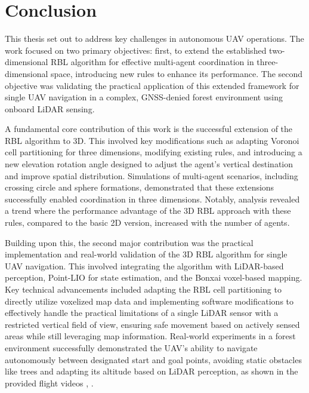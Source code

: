 
\chapter{Conclusion\label{chap:conclusion}}

This thesis set out to address key challenges in autonomous \ac{UAV} operations. 
The work focused on two primary objectives: first, to extend the established two-dimensional \ac{RBL} algorithm for effective multi-agent coordination in three-dimensional space, introducing new rules to enhance its performance. 
The second objective was validating the practical application of this extended framework for single  \ac{UAV} navigation in a complex, \ac{GNSS}-denied forest environment using onboard \ac{LiDAR} sensing.

A fundamental core contribution of this work is the successful extension of the \ac{RBL} algorithm to 3D.
This involved key modifications such as adapting Voronoi cell partitioning for three dimensions, modifying existing rules, and introducing a new elevation rotation angle designed to adjust the agent's vertical destination and improve spatial distribution. 
Simulations of multi-agent scenarios, including crossing circle and sphere formations, demonstrated that these extensions successfully enabled coordination in three dimensions. 
Notably, analysis revealed a trend where the performance advantage of the 3D \ac{RBL} approach with these rules, compared to the basic 2D version, increased with the number of agents.

Building upon this, the second major contribution was the practical implementation and real-world validation of the 3D \ac{RBL} algorithm for single  \ac{UAV} navigation. 
This involved integrating the algorithm with \ac{LiDAR}-based perception, \ac{Point-LIO} for state estimation, and the Bonxai voxel-based mapping. 
Key technical advancements included adapting the \ac{RBL} cell partitioning to directly utilize voxelized map data and implementing software modifications to effectively handle the practical limitations of a single \ac{LiDAR} sensor with a restricted vertical field of view, ensuring safe movement based on actively sensed areas while still leveraging map information. 
Real-world experiments in a forest environment successfully demonstrated the  \ac{UAV}'s ability to navigate autonomously between designated start and goal points, avoiding static obstacles like trees and adapting its altitude based on \ac{LiDAR} perception, as shown in the provided flight videos \cite{aggressive_flight}, \cite{conservative_flight}.

